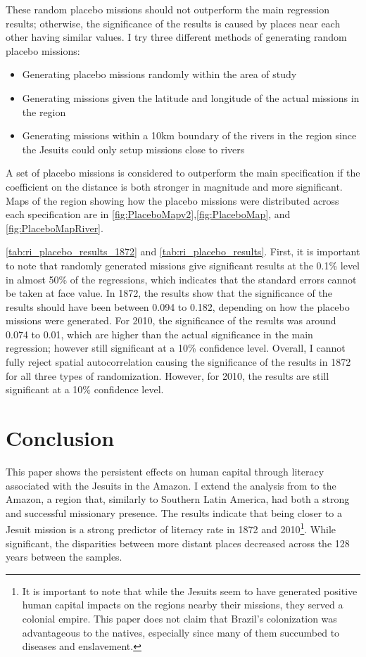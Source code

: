 \documentclass{article}
\begin{document}
These random placebo missions should not outperform the main regression results; otherwise, the significance of the results is caused by places near each other having similar values. 
I try three different methods of generating random placebo missions:

\begin{itemize}
\item Generating placebo missions randomly within the area of study
\item Generating missions given the latitude and longitude of the actual missions in the region
\item Generating missions within a 10km boundary of the rivers in the region since the Jesuits could only setup missions close to rivers
\end{itemize}

A set of placebo missions is considered to outperform the main specification if the coefficient on the distance is both stronger in magnitude and more significant. Maps of the region showing how the placebo missions were distributed across each specification are in \autoref{fig:PlaceboMapv2},\autoref{fig:PlaceboMap}, and \autoref{fig:PlaceboMapRiver}.

\autoref{tab:ri_placebo_results_1872} and \autoref{tab:ri_placebo_results}. First, it is important to note that randomly generated missions give significant results at the 0.1\% level in almost 50\% of the regressions, which indicates that the standard errors cannot be taken at face value. 
In 1872, the results show that the significance of the results should have been between 0.094 to 0.182, depending on how the placebo missions were generated. 
For 2010, the significance of the results was around 0.074 to 0.01, which are higher than the actual significance in the main regression; however still significant at a 10\% confidence level. 
Overall, I cannot fully reject spatial autocorrelation causing the significance of the results in 1872 for all three types of randomization.
However, for 2010, the results are still significant at a 10\% confidence level.

\section{Conclusion}

This paper shows the persistent effects on human capital through literacy associated with the Jesuits in the Amazon. 
I extend the analysis from \textcite{Valencia_Caicedo2018-gp} to the Amazon, a region that, similarly to Southern Latin America, had both a strong and successful missionary presence. 
The results indicate that being closer to a Jesuit mission is a strong predictor of literacy rate in 1872 and 2010\footnote{
  It is important to note that while the Jesuits seem to have generated positive human capital impacts on the regions nearby their missions, they served a colonial empire. This paper does not claim that Brazil's colonization was advantageous to the natives, especially since many of them succumbed to diseases and enslavement.}. 
While significant, the disparities between more distant places decreased across the 128 years between the samples. 
\end{document}
